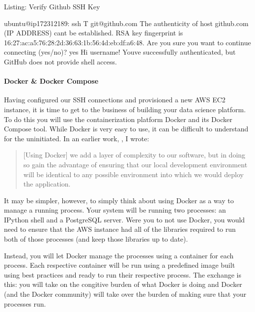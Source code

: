 \documentclass[letterpaper,10pt,english]{sphinxmanual}
\begin{document}
Listing: Verify Github SSH Key

%
\begin{sphinxVerbatim}[commandchars=\\\{\}]
ubuntu@ip\PYGZhy{}172\PYGZhy{}31\PYGZhy{}21\PYGZhy{}89:\PYGZti{}\PYGZdl{} ssh \PYGZhy{}T git@github.com
The authenticity of host \PYGZsq{}github.com (IP ADDRESS)\PYGZsq{} can\PYGZsq{}t be
established.
RSA key fingerprint is
16:27:ac:a5:76:28:2d:36:63:1b:56:4d:eb:df:a6:48.
Are you sure you want to continue connecting (yes/no)? yes
Hi username! You\PYGZsq{}ve successfully authenticated, but GitHub does
not provide shell access.
\end{sphinxVerbatim}


\paragraph{Docker \& Docker Compose}
\label{\detokenize{02-elastic-compute-cloud:Docker-_-Docker-Compose}}
Having configured our SSH connections and provisioned a new AWS EC2
instance, it is time to get to the business of building your data
science platform. To do this you will use the containerization platform
Docker and its Docker Compose tool. While Docker is very easy to use, it
can be difficult to understand for the uninitiated. In an earlier work,
,
I wrote:
\begin{quote}

{[}Using Docker{]} we add a layer of complexity to our software, but in
doing so gain the advantage of ensuring that our local development
environment will be identical to any possible environment into which
we would deploy the application.
\end{quote}

It may be simpler, however, to simply think about using Docker as a way
to manage a running process. Your system will be running two processes:
an IPython shell and a PostgreSQL server. Were you to not use Docker,
you would need to ensure that the AWS instance had all of the libraries
required to run both of those processes (and keep those libraries up to
date).

Instead, you will let Docker manage the processes using a container for
each process. Each respective container will be run using a predefined
image built using best practices and ready to run their respective
process. The exchange is this: you will take on the congitive burden of
 what Docker is doing and Docker (and the Docker
community) will take over the burden of making sure that your processes
run.
\end{document}
